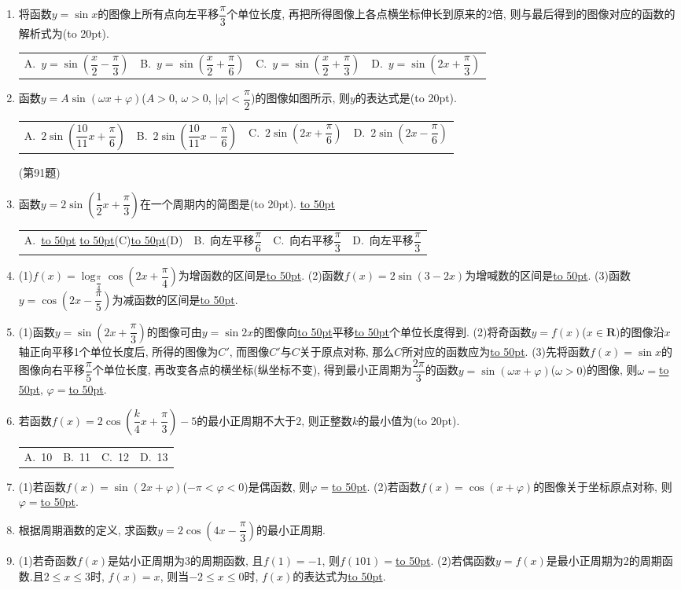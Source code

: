 \documentclass[10pt,a4paper]{article}
\newcommand{\blank}[1]{\underline{\hbox to #1pt{}}}
\newcommand{\bracket}[1]{(\hbox to #1pt{})}
\newcommand{\fourch}[4]{\par\begin{tabular}{p{.23\textwidth}p{.23\textwidth}p{.23\textwidth}p{.23\textwidth}}
A.~#1 &B.~#2& C.~#3& D.~#4
\end{tabular}}
\begin{document}
\begin{enumerate}[1.]
\item 将函数$y=\sin x$的图像上所有点向左平移$\dfrac{\pi}3$个单位长度, 再把所得图像上各点横坐标伸长到原来的2倍, 则与最后得到的图像对应的函数的解析式为\bracket{20}.
\fourch{$y=\sin (\dfrac x2-\dfrac{\pi}3)$}{$y=\sin (\dfrac x2+\dfrac{\pi}6)$}{$y=\sin (\dfrac x2+\dfrac{\pi}3)$}{$y=\sin (2x+\dfrac{\pi}3)$}
\item 函数$y=A\sin (\omega x+\varphi)$($A>0$, $\omega >0$, $|\varphi|<\dfrac{\pi}2$)的图像如图所示, 则$y$的表达式是\bracket{20}.
\fourch{$2\sin (\dfrac{10}{11}x+\dfrac{\pi}6)$}{$2\sin (\dfrac{10}{11}x-\dfrac{\pi}6)$}{$2\sin (2x+\dfrac{\pi}6)$}{$2\sin (2x-\dfrac{\pi}6)$}
(第91题)
\item 函数$y=2\sin (\dfrac 12x+\dfrac{\pi}3)$在一个周期内的简图是\bracket{20}.
\blank{50}\fourch{\blank{50}
\blank{50}(C)\blank{50}(D)
\item 要得到函数$y=\sin (\dfrac x2-\dfrac{\pi}6)$的图像.只需将函数$y=\sin \dfrac x2$的图像\bracket{20}.
(A)向右平移$\dfrac{\pi}6$}{向左平移$\dfrac{\pi}6$}{向右平移$\dfrac{\pi}3$}{向左平移$\dfrac{\pi}3$}
\item (1)$f(x)=\log _{\dfrac{\pi}4}\cos (2x+\dfrac{\pi}4)$为增函数的区间是\blank{50}.
(2)函数$f(x)=2\sin (3-2x)$为增喊数的区间是\blank{50}.
(3)函数$y=\cos (2x-\dfrac{\pi}5)$为减函数的区间是\blank{50}.
\item (1)函数$y=\sin (2x+\dfrac{\pi}3)$的图像可由$y=\sin 2x$的图像向\blank{50}平移\blank{50}个单位长度得到.
(2)将奇函数$y=f(x)$($x\in \mathbf{R}$)的图像沿$x$轴正向平移1个单位长度后, 所得的图像为$C'$, 而图像$C'$与$C$关于原点对称, 那么$C$所对应的函数应为\blank{50}.
(3)先将函数$f(x)=\sin x$的图像向右平移$\dfrac{\pi}5$个单位长度, 再改变各点的横坐标(纵坐标不变), 得到最小正周期为$\dfrac{2\pi}3$的函数$y=\sin (\omega x+\varphi)$($\omega >0$)的图像, 则$\omega =$\blank{50}, $\varphi =$\blank{50}.
\item 若函数$f(x)=2\cos (\dfrac k4x+\dfrac{\pi}3)-5$的最小正周期不大于2, 则正整数$k$的最小值为\bracket{20}.
\fourch{10}{11}{12}{13}
\item (1)若函数$f(x)=\sin (2x+\varphi)$($-\pi <\varphi <0$)是偶函数, 则$\varphi =$\blank{50}.
(2)若函数$f(x)=\cos (x+\varphi)$的图像关于坐标原点对称, 则$\varphi =$\blank{50}.
\item 根据周期涵数的定义, 求函数$y=2\cos (4x-\dfrac{\pi}3)$的最小正周期.
\item (1)若奇函数$f(x)$是姑小正周期为3的周期函数, 且$f(1)=-1$, 则$f(101)=$\blank{50}.
(2)若偶函数$y=f(x)$是最小正周期为2的周期函数.且$2\le x\le 3$时, $f(x)=x$, 则当$-2\le x\le 0$时, $f(x)$的表达式为\blank{50}.

\end{enumerate}
\end{document}
